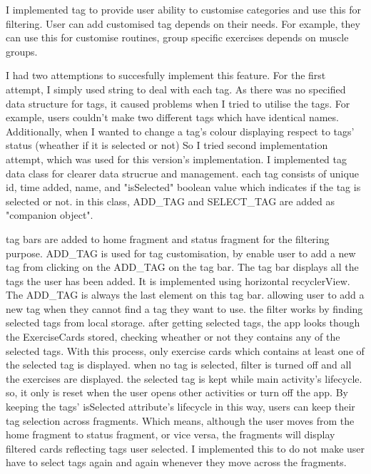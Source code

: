 
I implemented tag to provide user ability to customise categories and use this for filtering.
User can add customised tag depends on their needs.
For example, they can use this for customise routines, group specific exercises depends on muscle groups. 

I had two attemptions to succesfully implement this feature.
For the first attempt, I simply used string to deal with each tag.
As there was no specified data structure for tags, it caused problems when I tried to utilise the tags.
For example, users couldn't make two different tags which have identical names.
Additionally, when I wanted to change a tag's colour displaying respect to tags' status (wheather if it is selected or not)
So I tried second implementation attempt, which was used for this version's implementation.
I implemented tag data class for clearer data strucrue and management.
each tag consists of unique id, time added, name, and "isSelected" boolean value which indicates if the tag is selected or not.   
in this class, ADD_TAG and SELECT_TAG are added as "companion object". 

tag bars are added to home fragment and status fragment for the filtering purpose.
ADD_TAG is used for tag customisation, by enable user to add a new tag from clicking on the ADD_TAG on the tag bar.
The tag bar displays all the tags the user has been added. 
It is implemented using horizontal recyclerView. The ADD_TAG is always the last element on this tag bar.
allowing user to add a new tag when they cannot find a tag they want to use.
the filter works by finding selected tags from local storage.
after getting selected tags, the app looks though the ExerciseCards stored, checking wheather or not they contains any of the selected tags.
With this process, only exercise cards which contains at least one of the selected tag is displayed.
when no tag is selected, filter is turned off and all the exercises are displayed. 
the selected tag is kept while main activity's lifecycle.
so, it only is reset when the user opens other activities or turn off the app.
By keeping the tags' isSelected attribute's lifecycle in this way,
users can keep their tag selection across fragments.
Which means, although the user moves from the home fragment to status fragment, or vice versa,
the fragments will display filtered cards reflecting tags user selected.
I implemented this to do not make user have to select tags again and again whenever they move across the fragments.

